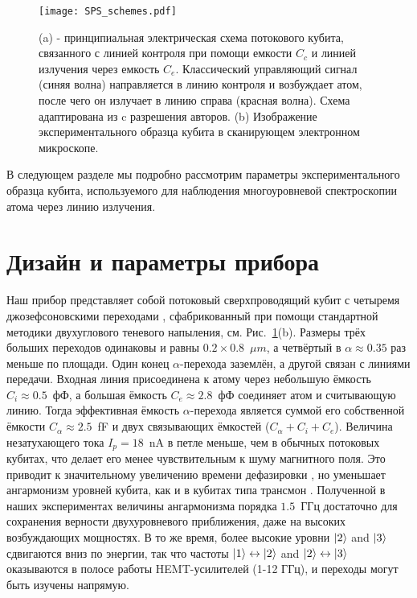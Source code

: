 \begin{figure}
	\centering
	\texttt{[image: SPS\_schemes.pdf]}
	\caption[Принципиальная электрическая схема и электронное изображение кубита, связанного с двумя полупространствами]{(a) - принципиальная электрическая схема потокового кубита, связанного с линией контроля при помощи емкости $C_c$ и линией излучения через емкость $C_e$. Классический управляющий сигнал (синяя волна) направляется в линию контроля и возбуждает атом, после чего он излучает в линию справа (красная волна). Схема адаптирована из \cite{peng2016tuneable} c разрешения авторов. (b) Изображение экспериментального образца кубита в сканирующем электронном микроскопе.}
	\label{fig: sps_scheme}
\end{figure}
В следующем разделе мы подробно рассмотрим параметры экспериментального образца кубита, используемого для наблюдения многоуровневой спектроскопии атома через линию излучения.
\section{Дизайн и параметры прибора}
Наш прибор представляет собой потоковый сверхпроводящий кубит с четыремя джозефсоновскими переходами \cite{Astafiev2010resonance,qiu2016four}, сфабрикованный при помощи стандартной методики двухуглового теневого напыления, см. Рис.~\ref{fig: sps_scheme}(b). Размеры трёх больших переходов одинаковы и равны $0.2\times0.8$~$\mu m $, а четвёртый в $\alpha \approx 0.35$ раз меньше по площади.  Один конец $\alpha$-перехода заземлён, а другой связан с линиями передачи. Входная линия присоединена к атому через небольшую ёмкость $C_i\approx0.5$~фФ, а большая ёмкость $C_e\approx2.8$~фФ соединяет атом и считывающую линию. Тогда эффективная ёмкость $\alpha$-перехода является суммой его собственной ёмкости $C_\alpha \approx 2.5$~fF  и двух связывающих ёмкостей ($C_\alpha + C_i + C_e$). Величина незатухающего тока $I_p=18$~nA в петле меньше, чем в обычных потоковых кубитах, что делает его менее чувствительным к шуму магнитного поля. Это приводит к значительному увеличению времени дефазировки \cite{yan2016flux}, но уменьшает ангармонизм уровней кубита, как и в кубитах типа трансмон \cite{koch2007charge}. Полученной в наших экспериментах величины ангармонизма порядка $1.5$~ГГц достаточно для сохранения верности двухуровневого приближения, даже на высоких возбуждающих мощностях. В то же время, более высокие уровни $\ket{2}$ and $\ket{3}$ сдвигаются вниз по энергии, так что частоты $\ket{1} \leftrightarrow \ket{2}$ and $\ket{2} \leftrightarrow \ket{3}$ оказываются в полосе работы HEMT-усилителей (1-12 ГГц), и переходы могут быть изучены напрямую.

